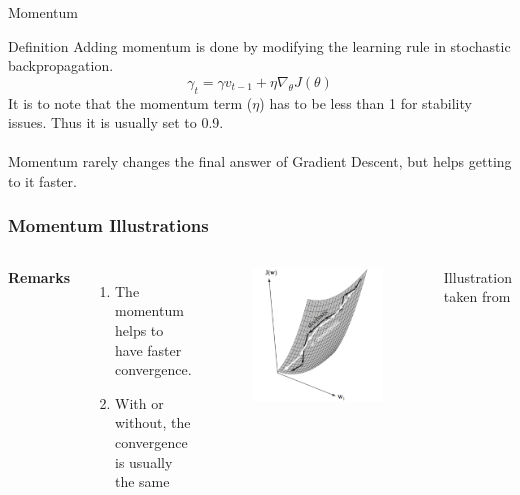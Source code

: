\documentclass{beamer}
\begin{document}
\begin{frame}{Momentum}
\begin{block}{Definition}
Adding momentum is done by modifying the learning rule in stochastic backpropagation. $$ \gamma_{t}=\gamma v_{t-1}+ \eta \nabla_{\theta}J(\theta)$$
It is to note that the momentum term ($\eta$) has to be less than 1 for stability issues. Thus it is usually set to 0.9. \\~\\
Momentum rarely changes the final answer of Gradient Descent, but helps getting to it faster.
\end{block}
\end{frame}


\begin{frame}
\frametitle{Momentum Illustrations}
\begin{columns}[c] %

\textbf{Remarks}
\begin{enumerate}
\item The momentum helps to have faster convergence.
\item With or without, the convergence is usually the same
\end{enumerate}

\begin{figure}
\includegraphics[width=0.8\linewidth]{pic/Momentum}
\end{figure}
Illustration taken from \cite{Duda}
\end{columns}
\end{frame}
\end{document}
